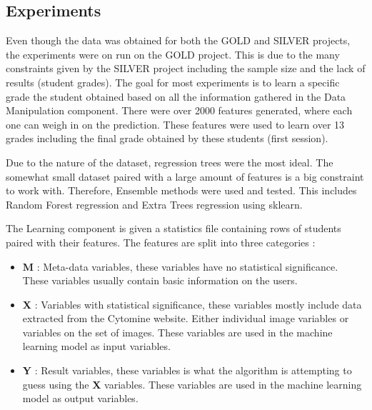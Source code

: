 \documentclass[a4paper,11pt]{report}
\numberwithin{figure}{section} %
\begin{document}
	\subsection{Experiments}
    
    
    Even though the data was obtained for both the GOLD and SILVER projects, the experiments were on run on the GOLD project.
    This is due to the many constraints given by the SILVER project including the sample size and the lack of results (student grades).
    The goal for most experiments is to learn a specific grade the student obtained based on all the information gathered in the Data Manipulation component.
    There were over 2000 features generated, where each one can weigh in on the prediction.
    These features were used to learn over 13 grades including the final grade obtained by these students (first session).\newline
    
    
    Due to the nature of the dataset, regression trees were the most ideal.
    The somewhat small dataset paired with a large amount of features is a big constraint to work with.
    Therefore, Ensemble methods were used and tested.
    This includes Random Forest regression and Extra Trees regression using sklearn.\newline
    
    The Learning component is given a statistics file containing rows of students paired with their features.
    The features are split into three categories :
    \begin{itemize}
\item[\textbullet] \textbf{M} : Meta-data variables, these variables have no statistical significance.
These variables usually contain basic information on the users.\\
\item[\textbullet] \textbf{X} : Variables with statistical significance, these variables mostly include data extracted from the Cytomine website.
Either individual image variables or variables on the set of images.
These variables are used in the machine learning model as input variables.\\
\item[\textbullet] \textbf{Y} : Result variables, these variables is what the algorithm is attempting to guess using the  \textbf{X} variables.
These variables are used in the machine learning model as output variables.\\
\end{itemize}
    
\end{document}

